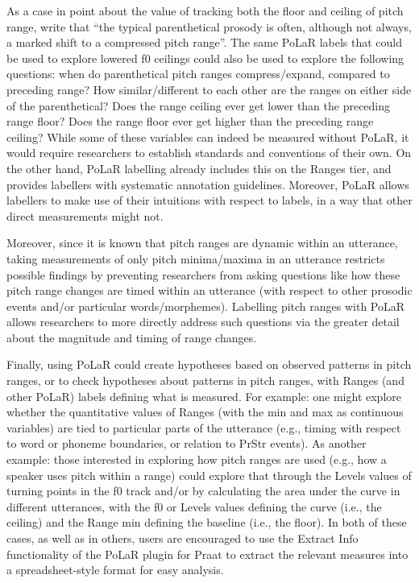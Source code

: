 \documentclass[11pt, twoside]{memoir}
\begin{document}
As a case in point about the value of tracking both the floor and ceiling of pitch range, \citet{dehewichmann10} write that “the typical parenthetical prosody is often, although not always, a marked shift to a compressed pitch range”. The same PoLaR labels that could be used to explore lowered f0 ceilings could also be used to explore the following questions: when do parenthetical pitch ranges compress\slash expand, compared to preceding range? How similar\slash different to each other are the ranges on either side of the parenthetical? Does the range ceiling ever get lower than the preceding range floor? Does the range floor ever get higher than the preceding range ceiling? While some of these variables can indeed be measured without PoLaR, it would require researchers to establish standards and conventions of their own. On the other hand, PoLaR labelling already includes this on the Ranges tier, and provides labellers with systematic annotation guidelines. Moreover, PoLaR allows labellers to make use of their intuitions with respect to labels, in a way that other direct measurements might not. 

Moreover, since it is known that pitch ranges are dynamic within an utterance, taking measurements of only pitch minima\slash maxima in an utterance restricts possible findings by preventing researchers from asking questions like how these pitch range changes are timed within an utterance (with respect to other prosodic events and/or particular words\slash morphemes). Labelling pitch ranges with PoLaR allows researchers to more directly address such questions via the greater detail about the magnitude and timing of range changes.  

Finally, using PoLaR could create hypotheses based on observed patterns in pitch ranges, or to check hypotheses about patterns in pitch ranges, with Ranges (and other PoLaR) labels defining what is measured. For example: one might explore whether the quantitative values of Ranges (with the min and max as continuous variables) are tied to particular parts of the utterance (e.g., timing with respect to word or phoneme boundaries, or relation to PrStr events). As another example: those interested in exploring how pitch ranges are used (e.g., how a speaker uses pitch within a range) could explore that through the Levels values of turning points in the f0 track and/or by calculating the area under the curve in different utterances, with the f0 or Levels values defining the curve (i.e., the ceiling) and the Range min defining the baseline (i.e., the floor). In both of these cases, as well as in others, users are encouraged to use the Extract Info functionality of the PoLaR plugin for Praat to extract the relevant measures into a spreadsheet-style format for easy analysis.
\end{document}
